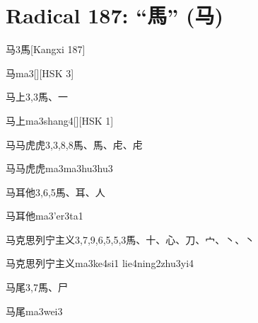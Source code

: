 
\section*{Radical 187: ``⾺'' (马)}

\begin{entry}{马}{3}{⾺}[Kangxi 187]
  \begin{phonetics}{马}{ma3}[][HSK 3]
  \end{phonetics}
\end{entry}

\begin{entry}{马上}{3,3}{⾺、⼀}
  \begin{phonetics}{马上}{ma3shang4}[][HSK 1]
  \end{phonetics}
\end{entry}

\begin{entry}{马马虎虎}{3,3,8,8}{⾺、⾺、⾌、⾌}
  \begin{phonetics}{马马虎虎}{ma3ma3hu3hu3}
  \end{phonetics}
\end{entry}

\begin{entry}{马耳他}{3,6,5}{⾺、⽿、⼈}
  \begin{phonetics}{马耳他}{ma3'er3ta1}
  \end{phonetics}
\end{entry}

\begin{entry}{马克思列宁主义}{3,7,9,6,5,5,3}{⾺、⼗、⼼、⼑、⼧、⼂、⼂}
  \begin{phonetics}{马克思列宁主义}{ma3ke4si1 lie4ning2zhu3yi4}
  \end{phonetics}
\end{entry}

\begin{entry}{马尾}{3,7}{⾺、⼫}
  \begin{phonetics}{马尾}{ma3wei3}
  \end{phonetics}
\end{entry}

